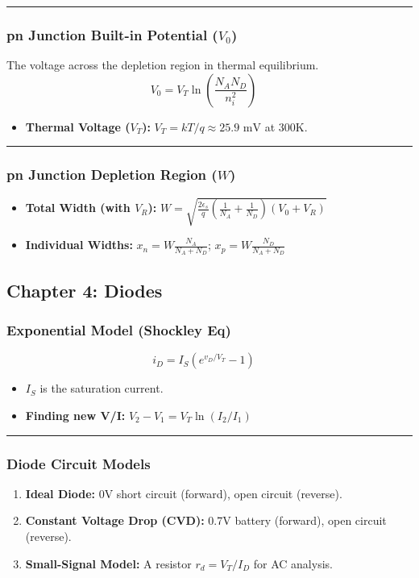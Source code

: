 \documentclass[10pt, letterpaper]{article}
\begin{document}
\hrule

\subsubsection*{pn Junction Built-in Potential ($V_0$)}
The voltage across the depletion region in thermal equilibrium.
\[ V_0 = V_T \ln \left( \frac{N_A N_D}{n_i^2} \right) \quad \text{} \]
\begin{itemize}
    \item \textbf{Thermal Voltage ($V_T$):} $V_T = kT/q \approx 25.9 \text{ mV}$ at 300K.
\end{itemize}

\hrule

\subsubsection*{pn Junction Depletion Region ($W$)}
\begin{itemize}
    \item \textbf{Total Width (with $V_R$):} $W = \sqrt{\frac{2\epsilon_s}{q} \left(\frac{1}{N_A} + \frac{1}{N_D}\right) (V_0 + V_R)}$
    \item \textbf{Individual Widths:} $x_n = W \frac{N_A}{N_A + N_D}$; $x_p = W \frac{N_D}{N_A + N_D}$
\end{itemize}

\subsection*{Chapter 4: Diodes}

\subsubsection*{Exponential Model (Shockley Eq)}
\[ i_D = I_S (e^{v_D / V_T} - 1) \quad \text{} \]
\begin{itemize}
    \item $I_S$ is the saturation current.
    \item \textbf{Finding new V/I:} $V_2 - V_1 = V_T \ln(I_2 / I_1)$
\end{itemize}

\hrule

\subsubsection*{Diode Circuit Models}
\begin{enumerate}
    \item \textbf{Ideal Diode:} 0V short circuit (forward), open circuit (reverse).
    \item \textbf{Constant Voltage Drop (CVD):} 0.7V battery (forward), open circuit (reverse).
    \item \textbf{Small-Signal Model:} A resistor $r_d = V_T / I_D$ for AC analysis.
\end{enumerate}
\end{document}
